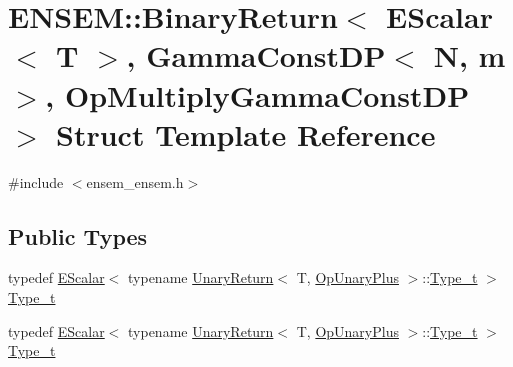 \hypertarget{structENSEM_1_1BinaryReturn_3_01EScalar_3_01T_01_4_00_01GammaConstDP_3_01N_00_01m_01_4_00_01OpMultiplyGammaConstDP_01_4}{}\section{E\+N\+S\+EM\+:\+:Binary\+Return$<$ E\+Scalar$<$ T $>$, Gamma\+Const\+DP$<$ N, m $>$, Op\+Multiply\+Gamma\+Const\+DP $>$ Struct Template Reference}
\label{structENSEM_1_1BinaryReturn_3_01EScalar_3_01T_01_4_00_01GammaConstDP_3_01N_00_01m_01_4_00_01OpMultiplyGammaConstDP_01_4}


{\ttfamily \#include $<$ensem\+\_\+ensem.\+h$>$}

\subsection*{Public Types}
\begin{DoxyCompactItemize}
\item 
typedef \mbox{\hyperlink{classENSEM_1_1EScalar}{E\+Scalar}}$<$ typename \mbox{\hyperlink{structENSEM_1_1UnaryReturn}{Unary\+Return}}$<$ T, \mbox{\hyperlink{structENSEM_1_1OpUnaryPlus}{Op\+Unary\+Plus}} $>$\+::\mbox{\hyperlink{structENSEM_1_1BinaryReturn_3_01EScalar_3_01T_01_4_00_01GammaConstDP_3_01N_00_01m_01_4_00_01OpMultiplyGammaConstDP_01_4_a47d78ff4c81dc5878b6f5df3cf5aa0a1}{Type\+\_\+t}} $>$ \mbox{\hyperlink{structENSEM_1_1BinaryReturn_3_01EScalar_3_01T_01_4_00_01GammaConstDP_3_01N_00_01m_01_4_00_01OpMultiplyGammaConstDP_01_4_a47d78ff4c81dc5878b6f5df3cf5aa0a1}{Type\+\_\+t}}
\item 
typedef \mbox{\hyperlink{classENSEM_1_1EScalar}{E\+Scalar}}$<$ typename \mbox{\hyperlink{structENSEM_1_1UnaryReturn}{Unary\+Return}}$<$ T, \mbox{\hyperlink{structENSEM_1_1OpUnaryPlus}{Op\+Unary\+Plus}} $>$\+::\mbox{\hyperlink{structENSEM_1_1BinaryReturn_3_01EScalar_3_01T_01_4_00_01GammaConstDP_3_01N_00_01m_01_4_00_01OpMultiplyGammaConstDP_01_4_a47d78ff4c81dc5878b6f5df3cf5aa0a1}{Type\+\_\+t}} $>$ \mbox{\hyperlink{structENSEM_1_1BinaryReturn_3_01EScalar_3_01T_01_4_00_01GammaConstDP_3_01N_00_01m_01_4_00_01OpMultiplyGammaConstDP_01_4_a47d78ff4c81dc5878b6f5df3cf5aa0a1}{Type\+\_\+t}}
\end{DoxyCompactItemize}


